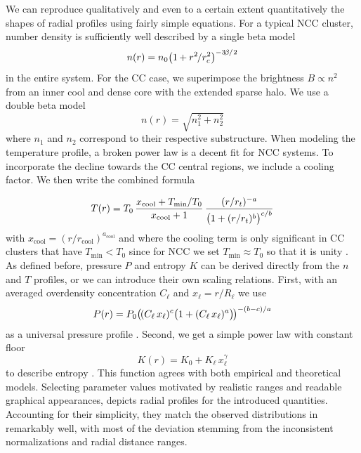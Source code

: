 We can reproduce qualitatively and even to a certain extent quantitatively the shapes of radial profiles using fairly simple equations.
For a typical NCC cluster, number density is sufficiently well described by a single beta model
\begin{equation*}
	n(r) = n_0 \!\left(1 \kern-0.5pt + r^2 \kern-1pt/ r_c^2 \right)^{-3\kern-1pt\beta\kern-0.5pt/\kern+0.5pt 2}
\end{equation*}
in the entire system. For the CC case, we superimpose the brightness $B \propto n^2$ from an inner cool and dense core with the
extended sparse halo. We use a double beta model
\begin{equation*}
	n(r) = \sqrt{n_1^2 + n_2^2}
\end{equation*}
where $n_1$ and $n_2$ correspond to their respective substructure. When modeling the temperature profile, a broken power law is a decent fit
for NCC systems. To incorporate the decline towards the CC central regions, we include a cooling factor. We then write the combined formula
\begin{equation*}
	T(r) = T_0 \,\frac{x_\text{cool} + T_\text{min} / T_0 \vphantom{^{\int}}}{x_\text{cool} + 1}
	\,\frac{(r / r_t)^{-a}}{\bigl(1 + (r / r_t)^b \bigr)^{c/b}}
\end{equation*}
with $x_\text{cool} = (r / r_\text{cool})^{a_\text{cool}}$ and where the cooling term is only significant in CC clusters that have
$T_\text{min} < T_0$ since for NCC we set $T_\text{min} \approx T_0$ so that it is unity \cite{vikh2006}. As defined before,
pressure $P$ and entropy $K$ can be derived directly from the $n$ and $T$ profiles, or we can introduce their own scaling relations.
First, with an averaged overdensity concentration $C_\ell$ and $x_\ell = r / R_\ell$ we use
\begin{equation*}
	P(r) = P_0 \!\left( \kern-1pt(C_\ell \,x_\ell)^c \bigl( 1 + (C_\ell \,x_\ell)^a \bigr) \kern-1pt \right)^{-(b - c) / a}
\end{equation*}
as a universal pressure profile \cite{arna2010}. Second, we get a simple power law with constant floor
\begin{equation*}
	K(r) = K_0 + K_\ell \, x_\ell^\gamma
\end{equation*}
to describe entropy \cite{cava2009}. This function agrees with both empirical and theoretical models. Selecting parameter values
motivated by realistic ranges and readable graphical appearances,  depicts radial profiles for the
introduced quantities. Accounting for their simplicity, they match the observed distributions in 
remarkably well, with most of the deviation stemming from the inconsistent normalizations and radial distance ranges.

